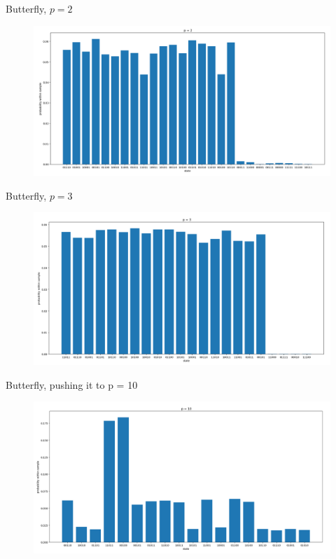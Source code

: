 \documentclass{beamer}
\begin{document}
\begin{frame}{Butterfly, $p = 2$}
\begin{figure}
	\centering
	\includegraphics[scale=0.3,left]{figures/butterfly-p2.png}
\end{figure}
\end{frame}

\begin{frame}{Butterfly, $p = 3$}
\begin{figure}
	\centering
	\includegraphics[scale=0.3,left]{figures/butterfly-p3.png}
\end{figure}
\end{frame}

\begin{frame}{Butterfly, pushing it to p = 10}
\begin{figure}
	\centering
	\includegraphics[scale=0.3,left]{figures/butterfly-p10.png}
\end{figure}
\end{frame}
\end{document}

